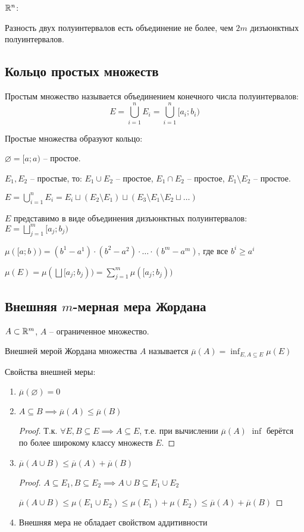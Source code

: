 $\mathbb{R}^n$:

Разность двух полуинтервалов есть объединение не более, чем $2m$ дизъюнктных полуинтервалов.

\subsection{Кольцо простых множеств}

\begin{definition}
    Простым множество называется объединением конечного числа полуинтервалов:
    $$E = \bigcup_{i=1}^{n} E_i = \bigcup_{i=1}^{n} [a_i; b_i)$$
\end{definition}

Простые множества образуют кольцо:

$\varnothing = [a; a)$ -- простое.

$E_1, E_2$ -- простые, то: $E_1 \cup E_2$ -- простое, $E_1 \cap E_2$ -- простое, $E_1 \setminus E_2$ -- простое.

$E = \bigcup_{i=1}^{n} E_i = E_i \sqcup (E_2 \setminus E_1) \sqcup (E_3 \setminus E_1 \setminus E_2 \sqcup \dots)$

$E$ представимо в виде объединения дизъюнктных полуинтервалов: $E = \bigsqcup_{j=1}^{m}[a_j; b_j)$

$\mu([a; b)) = (b^1 - a^1) \cdot (b^2 - a^2) \cdot \dots \cdot (b^m - a^m)$, где все $b^i \geq a^i$

$\mu(E) = \mu(\bigsqcup[a_j; b_j)) = \sum_{j=1}^{m} \mu([a_j; b_j))$

\subsection{Внешняя $m$-мерная мера Жордана}

$A \subset \mathbb{R}^m$, $A$ -- ограниченное множество.

Внешней мерой Жордана множества $A$ называется $\overline{\mu}(A) = \inf_{E, A \subseteq E} \mu(E)$

Свойства внешней меры:

\begin{enumerate}
    \item $\overline{\mu}(\varnothing) = 0$
    \item $A \subseteq B \implies \overline{\mu}(A) \leq \overline{\mu}(B)$
    \begin{proof}
        Т.к. $\forall E, B \subseteq E \implies A \subseteq E$, т.е. при вычислении $\overline{\mu}(A)$ $\inf$ берётся по более широкому классу множеств $E$.
    \end{proof}
    \item $\overline{\mu}(A \cup B) \leq \overline{\mu}(A) + \overline{\mu}(B)$
    \begin{proof}
        $A \subseteq E_1, B \subseteq E_2 \implies A \cup B \subseteq E_1 \cup E_2$

        $\overline{\mu}(A \cup B) \leq \mu(E_1 \cup E_2) \leq \mu(E_1) + \mu(E_2) \leq \overline{\mu}(A) + \overline{\mu}(B)$
    \end{proof}
    \item Внешняя мера не обладает свойством аддитивности
\end{enumerate}

